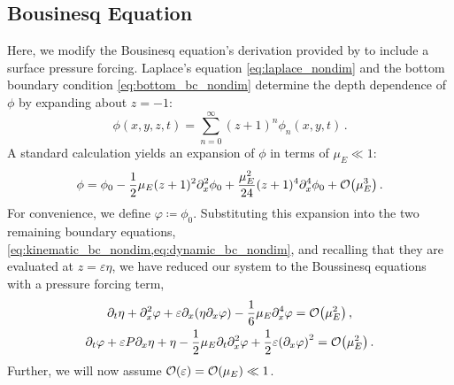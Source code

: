 \documentclass{jfm}
\renewcommand*{\epsilon}{\varepsilon}
\begin{document}
\subsection{Bousinesq Equation}
Here, we modify the Bousinesq equation's derivation provided by
\citet{mei2005nonlinear} to include a surface pressure forcing.
Laplace's equation \cref{eq:laplace_nondim} and the bottom boundary
condition \cref{eq:bottom_bc_nondim} determine the depth dependence of
$\phi$ by expanding about $z=-1$:
\begin{equation}
  \phi(x,y,z,t) = \sum_{n=0}^\infty (z+1)^n\phi_n(x,y,t) \,.
\end{equation}
A standard calculation \citep[\eg][]{mei2005nonlinear} yields an
expansion of $\phi$ in terms of $\mu_E \ll 1$:
\begin{equation}
  \phi = \phi_0 - \frac{1}{2}\mu_E (z+1)^2\partial^2_x\phi_0 +
  \frac{\mu_E^2}{24}(z+1)^4\partial^4_x\phi_0 +
  \order{\mu_E^3} \,.
\end{equation}
For convenience, we define $\varphi \coloneqq \phi_0$.
Substituting this expansion into the two remaining boundary equations,
\cref{eq:kinematic_bc_nondim,eq:dynamic_bc_nondim}, and recalling that
they are evaluated at $z=\epsilon \eta$, we have reduced our system to
the Boussinesq equations with a pressure forcing term,
\begin{gather}
  \partial_t \eta + \partial_x^2 \varphi + \epsilon \partial_x
    \pqty{\eta \partial_x \varphi} -\frac{1}{6}\mu_E \partial^4_x
    \varphi = \order{\mu_E^2} \label{eq:kinematic_bc_varphi} \,, \\
  \partial_t \varphi + \epsilon P \partial_x \eta + \eta -
    \frac{1}{2}\mu_E \partial_t \partial_x^2 \varphi +
    \frac{1}{2}\epsilon\pqty{\partial_x \varphi}^2 = \order{\mu_E^2} \,.
    \label{eq:dynamic_bc_varphi}
\end{gather}
Further, we will now assume $\order{\epsilon} = \order{\mu_E} \ll 1$.
\end{document}

